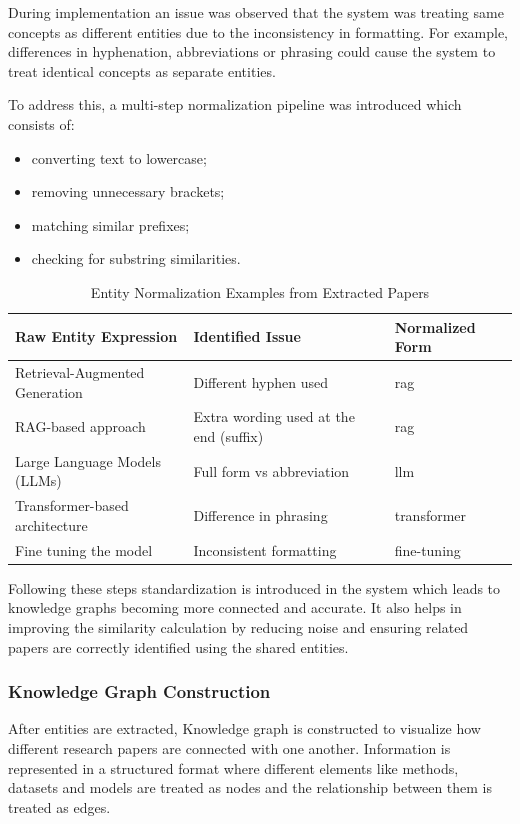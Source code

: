\documentclass[10pt]{article}
\begin{document}
During implementation an issue was observed that the system was treating same concepts as different entities due to the inconsistency in formatting. For example, differences in hyphenation, abbreviations or phrasing could cause the system to treat identical concepts as separate entities.

To address this, a multi-step normalization pipeline was introduced which consists of:
\begin{itemize}[leftmargin=*,noitemsep]
\item converting text to lowercase;
\item removing unnecessary brackets;
\item matching similar prefixes;
\item checking for substring similarities.
\end{itemize}

\begin{table}[htbp]
\centering
\caption{Entity Normalization Examples from Extracted Papers}
\label{tab:entity-normalization}
\begin{tabularx}{\linewidth}{Y Y Y}
\toprule
\textbf{Raw Entity Expression} & \textbf{Identified Issue} & \textbf{Normalized Form}\\
\midrule
Retrieval-Augmented Generation & Different hyphen used & rag\\
RAG-based approach & Extra wording used at the end (suffix) & rag\\
Large Language Models (LLMs) & Full form vs abbreviation & llm\\
Transformer-based architecture & Difference in phrasing & transformer\\
Fine tuning the model & Inconsistent formatting & fine-tuning\\
\bottomrule
\end{tabularx}
\end{table}

Following these steps standardization is introduced in the system which leads to knowledge graphs becoming more connected and accurate. It also helps in improving the similarity calculation by reducing noise and ensuring related papers are correctly identified using the shared entities.

\subsubsection{Knowledge Graph Construction}
After entities are extracted, Knowledge graph is constructed to visualize how different research papers are connected with one another. Information is represented in a structured format where different elements like methods, datasets and models are treated as nodes and the relationship between them is treated as edges.
\end{document}
